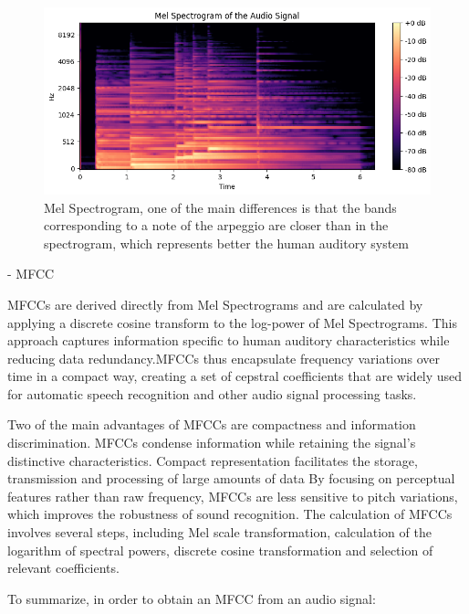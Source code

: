 \documentclass[11pt]{article}
\begin{document}
\begin{figure}[h]
  \centering
  \begin{minipage}{0.9\textwidth}
    \centering
    \includegraphics[width=1\textwidth]{"image/Mel_spectrogram_piano.png"}
    \caption{Mel Spectrogram, one of the main differences is that the bands corresponding to a note of the arpeggio are closer than in the spectrogram, which represents better the human auditory system}
    \label{fig:Mel_spectrogram_piano}
  \end{minipage}\hfill
\end{figure}


    - MFCC

MFCCs are derived directly from Mel Spectrograms and are calculated by applying a discrete cosine transform to the log-power of Mel Spectrograms. This approach captures information specific to human auditory characteristics while reducing data redundancy.MFCCs thus encapsulate frequency variations over time in a compact way, creating a set of cepstral coefficients that are widely used for automatic speech recognition and other audio signal processing tasks.

Two of the main advantages of MFCCs are compactness and information discrimination. MFCCs condense information while retaining the signal's distinctive characteristics. Compact representation facilitates the storage, transmission and processing of large amounts of data
By focusing on perceptual features rather than raw frequency, MFCCs are less sensitive to pitch variations, which improves the robustness of sound recognition.
The calculation of MFCCs involves several steps, including Mel scale transformation, calculation of the logarithm of spectral powers, discrete cosine transformation and selection of relevant coefficients.



To summarize, in order to obtain an MFCC from an audio signal:
\end{document}
